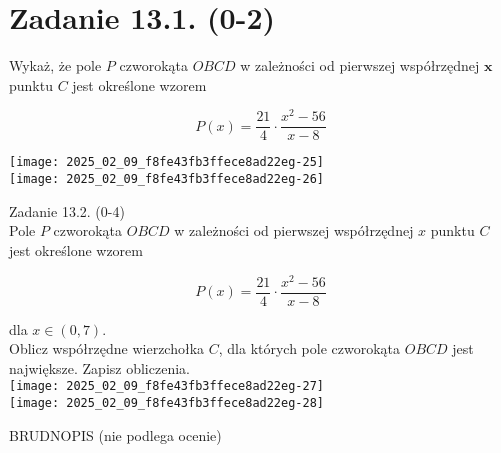 \documentclass[10pt]{article}
\begin{document}
\section*{Zadanie 13.1. (0-2)}
Wykaż, że pole \(P\) czworokąta \(O B C D\) w zależności od pierwszej współrzędnej \(\boldsymbol{x}\) punktu \(C\) jest określone wzorem

\[
P(x)=\frac{21}{4} \cdot \frac{x^{2}-56}{x-8}
\]

\texttt{[image: 2025\_02\_09\_f8fe43fb3ffece8ad22eg-25]}\\
\texttt{[image: 2025\_02\_09\_f8fe43fb3ffece8ad22eg-26]}

Zadanie 13.2. (0-4)\\
Pole \(P\) czworokąta \(O B C D\) w zależności od pierwszej współrzędnej \(x\) punktu \(C\) jest określone wzorem

\[
P(x)=\frac{21}{4} \cdot \frac{x^{2}-56}{x-8}
\]

dla \(x \in(0,7)\).\\
Oblicz współrzędne wierzchołka \(C\), dla których pole czworokąta \(O B C D\) jest największe. Zapisz obliczenia.\\
\texttt{[image: 2025\_02\_09\_f8fe43fb3ffece8ad22eg-27]}\\
\texttt{[image: 2025\_02\_09\_f8fe43fb3ffece8ad22eg-28]}

BRUDNOPIS (nie podlega ocenie)
\end{document}
